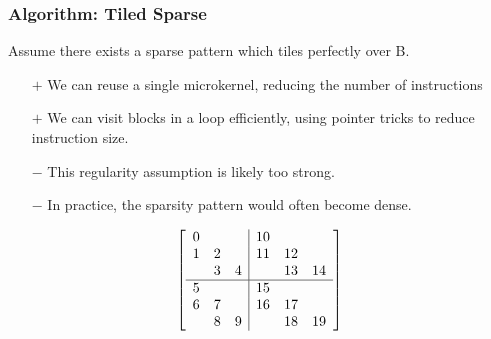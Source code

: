 \documentclass[9pt]{beamer}
\begin{document}
\begin{frame}[fragile]
  \frametitle{Algorithm: Tiled Sparse}
        Assume there exists a sparse pattern which tiles perfectly over B.
        \begin{itemize}
        \item[$+$] We can reuse a single microkernel, reducing the number of instructions
        \item[$+$] We can visit blocks in a loop efficiently, using pointer tricks to reduce instruction size.
        \item[$-$] This regularity assumption is likely too strong.
        \item[$-$] In practice, the sparsity pattern would often become dense.
        \end{itemize}


      \[
      \left[
          \begin{array}{c c c | c c c }
          0 &   &   & 10 &   &   \\
          1 & 2 &   & 11& 12&   \\
            & 3 & 4 &   & 13& 14  \\
          \hline
          5 &   &   & 15  &   &   \\
          6 & 7 &   & 16  &17   &   \\
            & 8 & 9 &   & 18  &19   \\
          \end{array}
          \right]
      \]
\end{frame}
\end{document}
